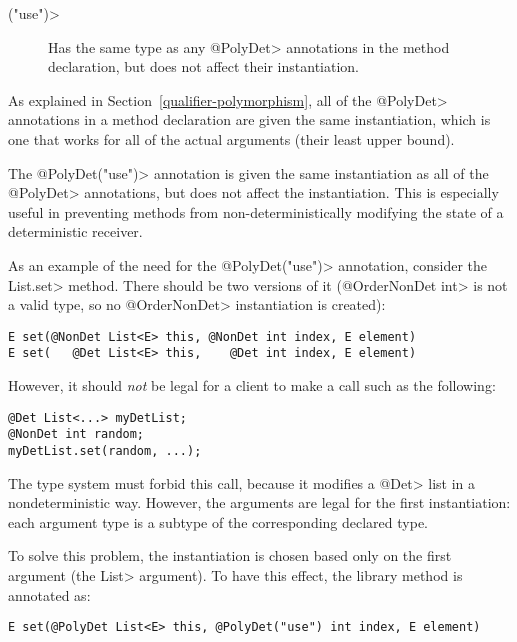 \begin{description}
\item[\<("use")>]
  Has the same type as any \<@PolyDet> annotations in the method
  declaration, but does not affect their instantiation.
\end{description}

As explained in Section~\ref{qualifier-polymorphism},
all of the \<@PolyDet> annotations in a method declaration are given the same
instantiation, which is one that works for all of the actual arguments
(their least upper bound).

The \<@PolyDet("use")> annotation is given the same instantiation as all of the
\<@PolyDet> annotations, but does not affect the instantiation. This is especially
useful in preventing methods from non-deterministically modifying the
state of a deterministic receiver.

As an example of the need for the \<@PolyDet("use")> annotation, consider the
\<List.set> method.  There should be two versions of it (\<@OrderNonDet
int> is not a valid type, so no \<@OrderNonDet> instantiation is created):

\begin{Verbatim}
E set(@NonDet List<E> this, @NonDet int index, E element)
E set(   @Det List<E> this,    @Det int index, E element)
\end{Verbatim}

\noindent
However, it should \emph{not} be legal for a client to make a call such as
the following:

\begin{Verbatim}
@Det List<...> myDetList;
@NonDet int random;
myDetList.set(random, ...);
\end{Verbatim}

\noindent
The type system must forbid this call, because it modifies a
\<@Det> list in a nondeterministic way.
However, the arguments are legal for the first instantiation:
each argument type is a subtype of the corresponding declared type.

To solve this problem, the instantiation is chosen based only on the first
argument (the \<List> argument).  To have this effect, the library method
is annotated as:

\begin{Verbatim}
E set(@PolyDet List<E> this, @PolyDet("use") int index, E element)
\end{Verbatim}



